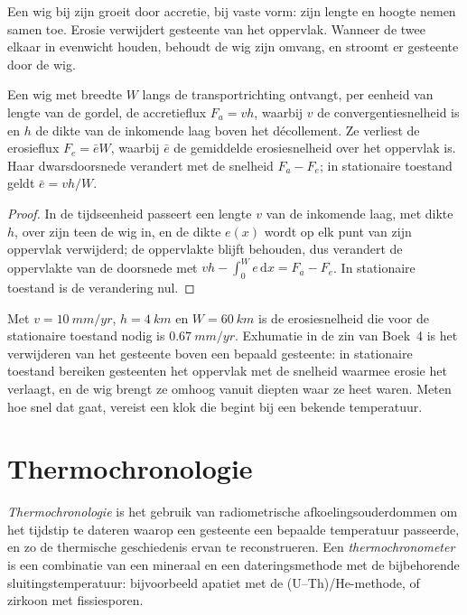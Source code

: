 Een wig bij zijn  groeit door accretie, bij vaste vorm: zijn lengte
en hoogte nemen samen toe. Erosie verwijdert gesteente van het oppervlak. Wanneer de
twee elkaar in evenwicht houden, behoudt de wig zijn omvang, en stroomt er gesteente door de wig.

\begin{proposition}\label{prop:b3:orogenic-wedges:flux}
Een wig met breedte $W$ langs de transportrichting ontvangt, per eenheid van lengte
van de gordel, de accretieflux $F_a = v h$, waarbij $v$ de convergentiesnelheid is
en $h$ de dikte van de inkomende laag boven het décollement. Ze verliest
de erosieflux $F_e = \bar e W$, waarbij $\bar e$ de gemiddelde
erosiesnelheid over het oppervlak is. Haar dwarsdoorsnede verandert met de snelheid $F_a -
F_e$; in stationaire toestand geldt $\bar e = vh/W$.
\end{proposition}

\begin{proof}
In de tijdseenheid passeert een lengte $v$ van de inkomende laag, met dikte $h$,
over zijn teen de wig in, en de dikte $e(x)$ wordt op elk
punt van zijn oppervlak verwijderd; de oppervlakte blijft behouden, dus verandert de oppervlakte van de doorsnede
met $vh - \int_0^W e\,\mathrm dx = F_a - F_e$. In stationaire toestand is de
verandering nul.
\end{proof}

Met $v = \qty{10}{mm/yr}$, $h = \qty{4}{km}$ en $W = \qty{60}{km}$ is de
erosiesnelheid die voor de stationaire toestand nodig is $\qty{0.67}{mm/yr}$. Exhumatie in de
zin van Boek~4 is het verwijderen van het gesteente boven een bepaald gesteente:
in stationaire toestand bereiken gesteenten het oppervlak met de snelheid waarmee erosie
het verlaagt, en de wig brengt ze omhoog vanuit diepten waar ze heet waren. Meten
hoe snel dat gaat, vereist een klok die begint bij een bekende temperatuur.

\section{Thermochronologie}\label{sec:b3:orogenic-wedges:thermochronology}

\begin{definition}\label{def:b3:orogenic-wedges:thermochronology}
\emph{Thermochronologie} is het gebruik van radiometrische
afkoelingsouderdommen om het tijdstip te dateren waarop een gesteente een bepaalde
temperatuur passeerde, en zo de thermische geschiedenis ervan te reconstrueren. Een
\emph{thermochronometer} is een combinatie van een mineraal en
een dateringsmethode met de bijbehorende sluitingstemperatuur: bijvoorbeeld apatiet met de
(U--Th)/He-methode, of zirkoon met fissiesporen.
\end{definition}

